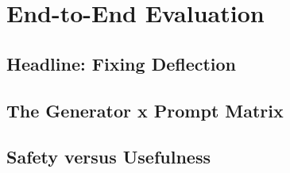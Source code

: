 \section{End-to-End Evaluation}
\label{sec:endtoend}


\subsection{Headline: Fixing Deflection}

\subsection{The Generator x Prompt Matrix}

\subsection{Safety versus Usefulness}

